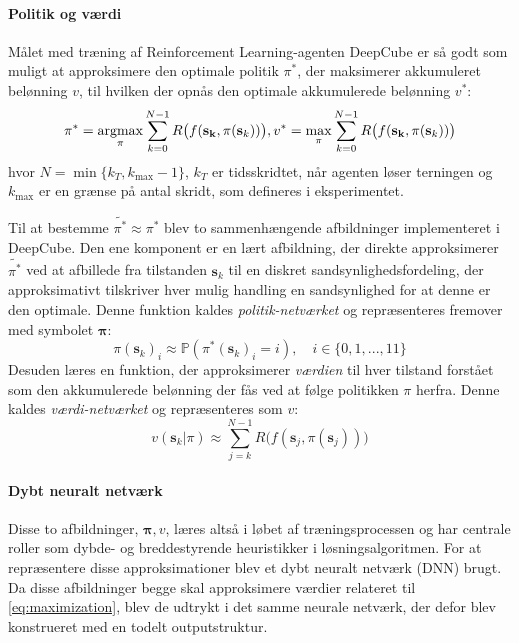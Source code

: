 \documentclass[../main.tex]{subfiles}
\begin{document}
\paragraph{Politik og værdi} Målet med træning af Reinforcement Learning-agenten DeepCube er så godt som muligt at approksimere den optimale politik \(\pi^*\), der maksimerer akkumuleret belønning \(v\), til hvilken der opnås den optimale akkumulerede belønning \(v^*\):
\begin{equation}\label{eq:maximization}
	\pi^* = \operatorname*{argmax}_{\pi}\sum_{k=0}^{N-1} R\big(f(\mathbf{s_k},\pi(\mathbf s_k))\big),
	v^* = \operatorname*{max}_\pi\sum_{k=0}^{N-1} R\big(f(\mathbf{s_k},\pi(\mathbf s_k))\big)
\end{equation}
hvor \(	N = \operatorname{min}\{k_T, k_{\text{max}}-1\}\), \(k_T\) er tidsskridtet, når agenten løser terningen og \(k_{\text{max}}\) er en grænse på antal skridt, som defineres i eksperimentet. 

Til at bestemme \(\widetilde {\pi ^*} \approx \pi^*\) blev to sammenhængende afbildninger implementeret i DeepCube.
Den ene komponent er en lært afbildning, der direkte approksimerer \(\widetilde {\pi ^*}\) ved at afbillede fra tilstanden \(\mathbf s_k\) til en diskret sandsynlighedsfordeling, der approksimativt tilskriver hver mulig handling en sandsynlighed for at denne er den optimale.
Denne funktion kaldes \textit{politik-netværket} og repræsenteres fremover med symbolet \(\bm \pi\):
\[
\pi(\mathbf s_k)_i \approx \mathbb P (\pi^*(\mathbf s_k)_i = i ),\quad i \in \{0,1, ..., 11\}
\]
Desuden læres en funktion, der approksimerer \textit{værdien} til hver tilstand forstået som den akkumulerede belønning der fås ved at følge politikken \(\pi\) herfra.
Denne kaldes \textit{værdi-netværket} og repræsenteres som \(v\):
\[
v(\mathbf s_k| \pi) \approx \sum_{j=k}^{N-1} R\big(f(\mathbf s_j,\pi(\mathbf s_j))\big)
\]
\paragraph{Dybt neuralt netværk} Disse to afbildninger, \(\bm \pi, v\), læres altså i løbet af træningsprocessen og har centrale roller som dybde- og breddestyrende heuristikker i  løsningsalgoritmen.
For at repræsentere disse approksimationer blev et dybt neuralt netværk (DNN) brugt.
Da disse afbildninger begge skal approksimere værdier relateret til  \eqref{eq:maximization}, blev de udtrykt i det samme neurale netværk, der defor blev konstrueret med en todelt outputstruktur. 
\end{document}

